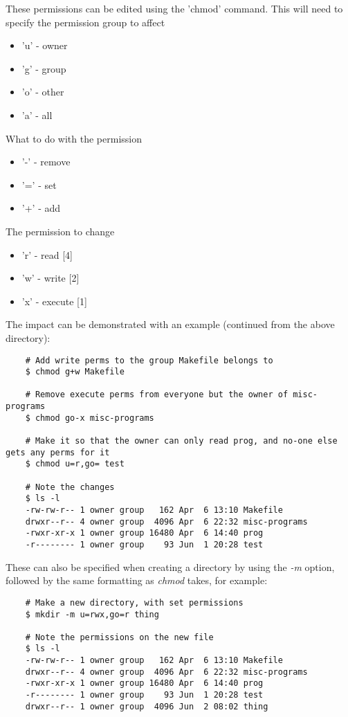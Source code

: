 \documentclass{article}
\begin{document}
These permissions can be edited using the 'chmod' command. This will need to specify the permission group to affect
\begin{itemize}
    \item 'u' - owner
    \item 'g' - group
    \item 'o' - other
    \item 'a' - all
\end{itemize}
What to do with the permission
\begin{itemize}
    \item '-' - remove
    \item '=' - set
    \item '+' - add
\end{itemize}
The permission to change
\begin{itemize}
    \item 'r' - read [4]
    \item 'w' - write [2]
    \item 'x' - execute [1]
\end{itemize}
The impact can be demonstrated with an example (continued from the above directory):
\begin{verbatim}
    # Add write perms to the group Makefile belongs to
    $ chmod g+w Makefile

    # Remove execute perms from everyone but the owner of misc-programs
    $ chmod go-x misc-programs

    # Make it so that the owner can only read prog, and no-one else gets any perms for it
    $ chmod u=r,go= test
    
    # Note the changes
    $ ls -l
    -rw-rw-r-- 1 owner group   162 Apr  6 13:10 Makefile
    drwxr--r-- 4 owner group  4096 Apr  6 22:32 misc-programs
    -rwxr-xr-x 1 owner group 16480 Apr  6 14:40 prog
    -r-------- 1 owner group    93 Jun  1 20:28 test
\end{verbatim}

These can also be specified when creating a directory by using the \textit{-m} option, followed by the same formatting as \textit{chmod} takes, for example:
\begin{verbatim}
    # Make a new directory, with set permissions
    $ mkdir -m u=rwx,go=r thing
    
    # Note the permissions on the new file
    $ ls -l
    -rw-rw-r-- 1 owner group   162 Apr  6 13:10 Makefile
    drwxr--r-- 4 owner group  4096 Apr  6 22:32 misc-programs
    -rwxr-xr-x 1 owner group 16480 Apr  6 14:40 prog
    -r-------- 1 owner group    93 Jun  1 20:28 test
    drwxr--r-- 1 owner group  4096 Jun  2 08:02 thing
\end{verbatim}
\end{document}
